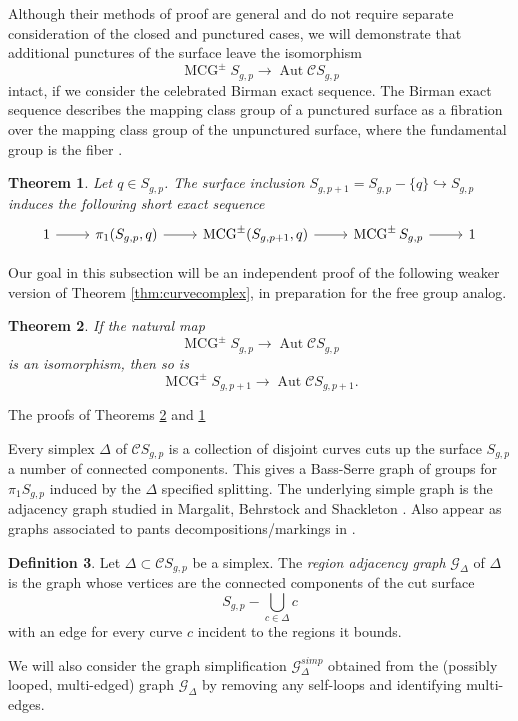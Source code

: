 \documentclass[11pt]{article}
\DeclareMathOperator{\mcg}{MCG}
\DeclareMathOperator{\aaut}{Aut}
\newtheorem{theorem}{Theorem}
\theoremstyle{remark}
\theoremstyle{definition}
\newtheorem{definition}[theorem]{Definition}
\begin{document}
Although their methods of proof are general and
do not require separate consideration of the closed and
punctured cases, we will demonstrate
that additional punctures of the surface
leave the isomorphism
$$
\mcg^\pm S_{g,p} \to  \aaut \mathcal C S_{g,p}
$$
intact,
if we consider the celebrated Birman exact sequence.
The Birman exact sequence
describes the
mapping class group of a punctured surface
as a fibration
over the mapping class group of the unpunctured surface,
where the fundamental group is the fiber \cite{MR0243519}.

\begin{theorem}
  Let $q\in S_{g,p}$.
  The surface inclusion $S_{g,p+1}=S_{g,p}-\{q\} \hookrightarrow S_{g,p}$
  induces the following short exact sequence
  $$
  \begin{tikzcd}
  1 \arrow[r]&
  \pi_1(S_{g,p},q) \arrow[r]&
  \mcg^{\pm}(S_{g,p+1},q)  \arrow[r]&
  \mcg^{\pm}S_{g,p} \arrow[r]&
  1
  \end{tikzcd}
  $$
  \label{thm:puncrigid}
\end{theorem}

Our goal in this subsection will be an independent proof of
the following
weaker version of Theorem \ref{thm:curvecomplex},
in preparation for the free group analog.

\begin{theorem}
  If the natural map
  $$
  \mcg^\pm S_{g,p} \to  \aaut \mathcal C S_{g,p}
  $$
  is an isomorphism, then so is
  $$
  \mcg^\pm S_{g,p+1} \to  \aaut \mathcal C S_{g,p+1}.
  $$
  \label{thm:addpunc}
\end{theorem}

The proofs of Theorems \ref{thm:addpunc} and  \ref{thm:puncrigid}



Every simplex $\Delta$ of $\mathcal C S_{g,p}$
is a collection of disjoint curves cuts up the surface $S_{g,p}$
a number of connected components.
This gives a
Bass-Serre
graph of groups \cite{MR607504} for $\pi_1 S_{g,p}$
induced by the $\Delta$ specified splitting.
The underlying simple graph
is the adjacency graph studied in
Margalit, Behrstock \cite{MR2239449}
and Shackleton \cite{MR2318453}.
Also appear as graphs associated to
pants decompositions/markings in \cite{MR579573}.

\begin{definition}
Let $\Delta \subset \mathcal C S_{g,p}$ be a simplex.
The \emph{region adjacency graph} $\mathcal G_\Delta$
of $\Delta$
is the graph whose
vertices are the connected components of
the cut surface
$$
S_{g,p} - \bigcup_{c \in \Delta} c
$$
with an edge for
every curve $c$ incident to the regions it bounds.

We will also consider the graph simplification
$\mathcal G^{simp}_{\Delta}$ obtained
from the (possibly looped, multi-edged) graph
$\mathcal G_\Delta$ by
removing any self-loops and
identifying multi-edges.
\label{def:graphadj}
\end{definition}
\end{document}
